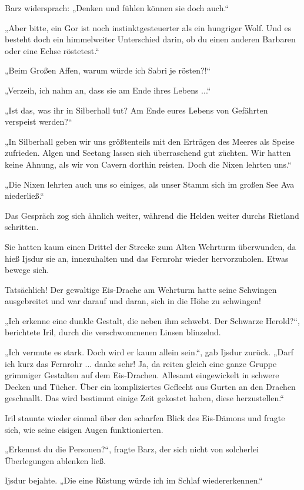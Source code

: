 Barz widersprach: „Denken und fühlen können sie doch auch.“

„Aber bitte, ein Gor ist noch instinktgesteuerter als ein hungriger Wolf. Und es besteht doch ein himmelweiter Unterschied darin, ob du einen anderen Barbaren oder eine Echse röstetest.“

„Beim Großen Affen, warum würde ich Sabri je rösten?!“

„Verzeih, ich nahm an, dass sie am Ende ihres Lebens ...“

„Ist das, was ihr in Silberhall tut? Am Ende eures Lebens von Gefährten verspeist werden?“

„In Silberhall geben wir uns größtenteils mit den Erträgen des Meeres als Speise zufrieden. Algen und Seetang lassen sich überraschend gut züchten. Wir hatten keine Ahnung, als wir von Cavern dorthin reisten. Doch die Nixen lehrten uns.“

„Die Nixen lehrten auch uns so einiges, als unser Stamm sich im großen See Ava niederließ.“

Das Gespräch zog sich ähnlich weiter, während die Helden weiter durchs Rietland schritten.

Sie hatten kaum einen Drittel der Strecke zum Alten Wehrturm überwunden, da hieß Ijsdur sie an, innezuhalten und das Fernrohr wieder hervorzuholen. Etwas bewege sich.

Tatsächlich! Der gewaltige Eis-Drache am Wehrturm hatte seine Schwingen ausgebreitet und war darauf und daran, sich in die Höhe zu schwingen!

„Ich erkenne eine dunkle Gestalt, die neben ihm schwebt. Der Schwarze Herold?“, berichtete Iril, durch die verschwommenen Linsen blinzelnd.

„Ich vermute es stark. Doch wird er kaum allein sein.“, gab Ijsdur zurück. „Darf ich kurz das Fernrohr ... danke sehr! Ja, da reiten gleich eine ganze Gruppe grimmiger Gestalten auf dem Eis-Drachen. Allesamt eingewickelt in schwere Decken und Tücher. Über ein kompliziertes Geflecht aus Gurten an den Drachen geschnallt. Das wird bestimmt einige Zeit gekostet haben, diese herzustellen.“

Iril staunte wieder einmal über den scharfen Blick des Eis-Dämons und fragte sich, wie seine eisigen Augen funktionierten.

„Erkennst du die Personen?“, fragte Barz, der sich nicht von solcherlei Überlegungen ablenken ließ.

Ijsdur bejahte. „Die eine Rüstung würde ich im Schlaf wiedererkennen.“

